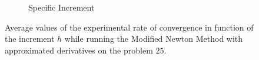 \begin{figure}[htbp]
\begin{subfigure}[t]{0.45\textwidth}
        \caption{Specific Increment }
    \end{subfigure}
    \caption{ \small Average values of the experimental rate of convergence in function of the increment $h$  while running the Modified Newton Method with approximated derivatives on the problem $25$.}
\end{figure}


